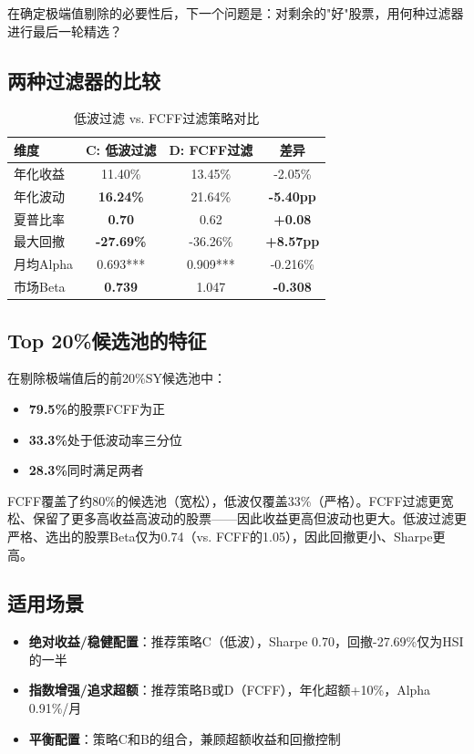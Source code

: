 \documentclass[10pt,a4paper]{ctexart}
\begin{document}
在确定极端值剔除的必要性后，下一个问题是：对剩余的"好"股票，用何种过滤器进行最后一轮精选？

\subsection{两种过滤器的比较}

\begin{table}[htbp]
\centering
\caption{低波过滤 vs. FCFF过滤策略对比}
\begin{tabular}{lccc}
\toprule
\textbf{维度} & \textbf{C: 低波过滤} & \textbf{D: FCFF过滤} & \textbf{差异} \\
\midrule
年化收益 & 11.40\% & 13.45\% & -2.05\% \\
年化波动 & \textbf{16.24\%} & 21.64\% & \textbf{-5.40pp} \\
夏普比率 & \textbf{0.70} & 0.62 & \textbf{+0.08} \\
最大回撤 & \textbf{-27.69\%} & -36.26\% & \textbf{+8.57pp} \\
月均Alpha & 0.693*** & 0.909*** & -0.216\% \\
市场Beta & \textbf{0.739} & 1.047 & \textbf{-0.308} \\
\bottomrule
\end{tabular}
\end{table}

\subsection{Top 20\%候选池的特征}

在剔除极端值后的前20\%SY候选池中：
\begin{itemize}
    \item \textbf{79.5\%}的股票FCFF为正
    \item \textbf{33.3\%}处于低波动率三分位
    \item \textbf{28.3\%}同时满足两者
\end{itemize}

FCFF覆盖了约80\%的候选池（宽松），低波仅覆盖33\%（严格）。FCFF过滤更宽松、保留了更多高收益高波动的股票——因此收益更高但波动也更大。低波过滤更严格、选出的股票Beta仅为0.74（vs. FCFF的1.05），因此回撤更小、Sharpe更高。

\subsection{适用场景}

\begin{itemize}
    \item \textbf{绝对收益/稳健配置}：推荐策略C（低波），Sharpe 0.70，回撤-27.69\%仅为HSI的一半
    \item \textbf{指数增强/追求超额}：推荐策略B或D（FCFF），年化超额+10\%，Alpha 0.91\%/月
    \item \textbf{平衡配置}：策略C和B的组合，兼顾超额收益和回撤控制
\end{itemize}
\end{document}
